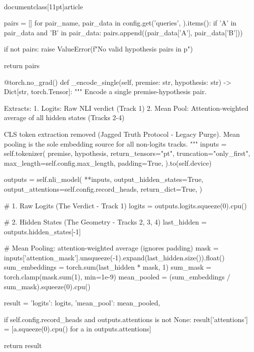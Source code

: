 \\documentclass[11pt]{article}
\begin{document}
\begin{CodeBlock}
        pairs = []
        for pair_name, pair_data in config.get('queries', {}).items():
            if 'A' in pair_data and 'B' in pair_data:
                pairs.append((pair_data['A'], pair_data['B']))
        
        if not pairs:
            raise ValueError(f"No valid hypothesis pairs in {p}")
        
        return pairs
    
    @torch.no_grad()
    def _encode_single(self, premise: str, hypothesis: str) -> Dict[str, torch.Tensor]:
        """
        Encode a single premise-hypothesis pair.

        Extracts:
        1. Logits: Raw NLI verdict (Track 1)
        2. Mean Pool: Attention-weighted average of all hidden states (Tracks 2-4)

        CLS token extraction removed (Jagged Truth Protocol - Legacy Purge).
        Mean pooling is the sole embedding source for all non-logits tracks.
        """
        inputs = self.tokenizer(
            premise,
            hypothesis,
            return_tensors="pt",
            truncation="only_first",
            max_length=self.config.max_length,
            padding=True,
        ).to(self.device)

        outputs = self.nli_model(
            **inputs,
            output_hidden_states=True,
            output_attentions=self.config.record_heads,
            return_dict=True,
        )

        # 1. Raw Logits (The Verdict - Track 1)
        logits = outputs.logits.squeeze(0).cpu()

        # 2. Hidden States (The Geometry - Tracks 2, 3, 4)
        last_hidden = outputs.hidden_states[-1]

        # Mean Pooling: attention-weighted average (ignores padding)
        mask = inputs['attention_mask'].unsqueeze(-1).expand(last_hidden.size()).float()
        sum_embeddings = torch.sum(last_hidden * mask, 1)
        sum_mask = torch.clamp(mask.sum(1), min=1e-9)
        mean_pooled = (sum_embeddings / sum_mask).squeeze(0).cpu()

        result = {
            'logits': logits,
            'mean_pool': mean_pooled,
        }
        
        if self.config.record_heads and outputs.attentions is not None:
            result['attentions'] = [a.squeeze(0).cpu() for a in outputs.attentions]
        
        return result
    

\end{CodeBlock}
\end{document}
